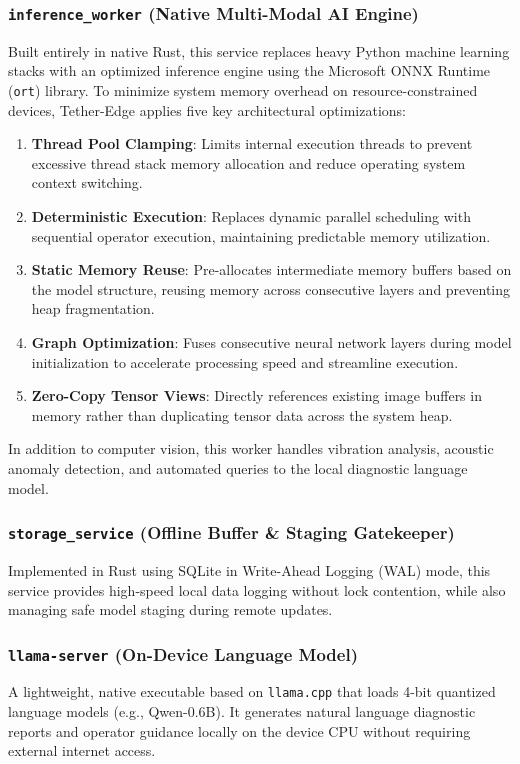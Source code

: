 \documentclass[conference]{IEEEtran}
\begin{document}
    \subsubsection{\texttt{inference\_worker} (Native Multi-Modal AI Engine)}
    Built entirely in native Rust, this service replaces heavy Python machine learning stacks with an optimized inference engine using the Microsoft ONNX Runtime
    (\texttt{ort}) library. To minimize system memory overhead on resource-constrained devices, Tether-Edge applies five key architectural optimizations:
    \begin{enumerate}
        \item \textbf{Thread Pool Clamping}: Limits internal execution threads to prevent excessive thread stack memory allocation and reduce operating system
        context switching.
        \item \textbf{Deterministic Execution}: Replaces dynamic parallel scheduling with sequential operator execution, maintaining predictable memory
        utilization.
        \item \textbf{Static Memory Reuse}: Pre-allocates intermediate memory buffers based on the model structure, reusing memory across consecutive layers and
        preventing heap fragmentation.
        \item \textbf{Graph Optimization}: Fuses consecutive neural network layers during model initialization to accelerate processing speed and streamline
        execution.
        \item \textbf{Zero-Copy Tensor Views}: Directly references existing image buffers in memory rather than duplicating tensor data across the system heap.
    \end{enumerate}
    In addition to computer vision, this worker handles vibration analysis, acoustic anomaly detection, and automated queries to the local diagnostic language
    model.

    \subsubsection{\texttt{storage\_service} (Offline Buffer \& Staging Gatekeeper)}
    Implemented in Rust using SQLite in Write-Ahead Logging (WAL) mode, this service provides high-speed local data logging without lock contention, while also
    managing safe model staging during remote updates.

    \subsubsection{\texttt{llama-server} (On-Device Language Model)}
    A lightweight, native executable based on \texttt{llama.cpp} that loads 4-bit quantized language models (e.g., Qwen-0.6B). It generates natural language 
    diagnostic reports and operator guidance locally on the device CPU without requiring external internet access.
\end{document}
